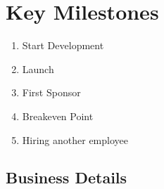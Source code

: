 \documentclass{article}[18pt]
\begin{document}
\section{Key Milestones}
\begin{enumerate}
	\item Start Development
	\item Launch
	\item First Sponsor
	\item Breakeven Point
	\item Hiring another employee
\end{enumerate}
\begin{appendices}
\appendix
\section{Business Details}

\end{appendices}
\end{document}
